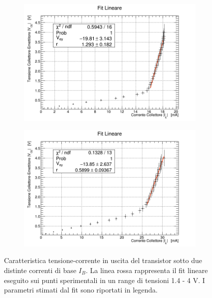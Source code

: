 \documentclass[a4paper,11pt]{article}
\begin{document}
\begin{figure} [h]
  \begin{subfigure}{0.49\textwidth}
    \centering
    \includegraphics[width = \textwidth]{../analisi_dati/IV100_inverted.png}
  \end{subfigure}
  \begin{subfigure}{0.49\textwidth}
    \centering
    \includegraphics[width = \textwidth]{../analisi_dati/IV200_inverted.png}
  \end{subfigure}
  \caption{Caratteristica tensione-corrente in uscita del transistor sotto due distinte correnti di base $I_B$. La linea rossa rappresenta il fit lineare eseguito sui punti sperimentali in un range di tensioni  1.4 - 4 V. I parametri stimati dal fit sono riportati in legenda.}
\end{figure}
\end{document}
